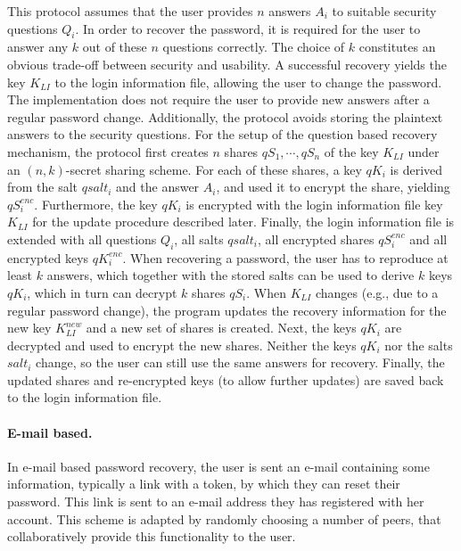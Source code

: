  This protocol assumes that the user provides $n$ answers $A_i$ to suitable
 security questions $Q_i$. In order to recover the password, it is
 required for the user to answer any $k$ out of these $n$ questions
 correctly. The choice of $k$ constitutes an obvious trade-off
 between security and usability. A successful recovery yields
 the key $K_{LI}$ to the login information file, allowing the user to
change the password. The implementation
does not require the user to provide new answers after a regular
 password change. Additionally, the protocol avoids storing the plaintext
 answers to the security questions.
 For the setup of the question based recovery mechanism, the protocol first
creates $n$ shares $qS_1, \cdots, qS_n$ of the
 key $K_{LI}$ under an $(n, k)$-secret sharing scheme. For each of
 these shares, a key $qK_i$ is derived from the salt $qsalt_i$ and the answer
$A_i$, and used it to encrypt the share,
 yielding $qS^{enc}_i$. Furthermore, the key $qK_i$ is encrypted with
 the login information file key $K_{LI}$ for the update procedure
 described later. Finally, the login information file is extended
 with all questions $Q_i$, all salts $qsalt_i$, all encrypted shares
 $qS_i^{enc}$ and all encrypted keys $qK_i^{enc}$. When recovering a password, the
 user has to reproduce at least $k$ answers, which together with
 the stored salts can be used to derive $k$ keys $qK_i$, which in
 turn can decrypt $k$ shares $qS_i$.
 When $K_{LI}$ changes (e.g., due to a regular password
 change), the program updates the recovery information %
 for the new key $K_{LI}^{new}$ and a new set of shares is created.
 Next, the keys $qK_i$ are decrypted and used to encrypt the new
 shares. Neither the keys $qK_i$ nor the salts $salt_i$ change, so
 the user can still use the same answers for recovery. Finally,
 the updated shares and re-encrypted keys (to allow further
 updates) are saved back to the login information file.

\paragraph{E-mail based.}

  In e-mail based password recovery, the user is sent an e-mail
 containing some information, typically a link with a token, by
 which they can reset their password. This link is sent to an e-mail
 address they has registered with her account.
 This scheme is adapted by randomly choosing a number of
 peers, that collaboratively provide this functionality to the user.
 


